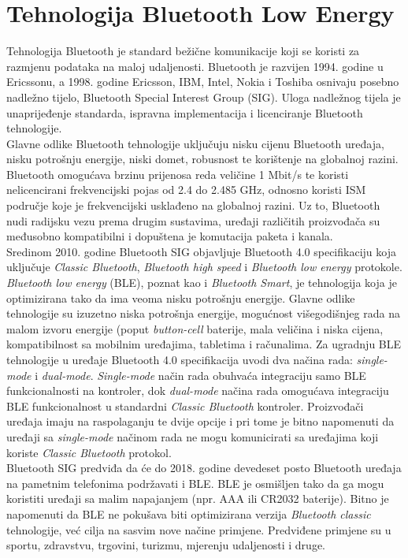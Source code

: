 \chapter{Tehnologija Bluetooth Low Energy}
Tehnologija Bluetooth je standard bežične komunikacije koji se koristi za razmjenu podataka na maloj udaljenosti. Bluetooth je razvijen 1994. godine u Ericssonu, a 1998. godine Ericsson, IBM, Intel, Nokia i Toshiba osnivaju posebno nadležno tijelo, Bluetooth Special Interest Group (SIG). Uloga nadležnog tijela je unaprijeđenje standarda, ispravna implementacija i licenciranje Bluetooth tehnologije.
\\

Glavne odlike Bluetooth tehnologije uključuju nisku cijenu Bluetooth uređaja, nisku potrošnju energije, niski domet, robusnost te korištenje na globalnoj razini.
Bluetooth omogućava brzinu prijenosa reda veličine 1 Mbit/s te koristi nelicencirani frekvencijski pojas od 2.4 do 2.485 GHz, odnosno koristi ISM područje  koje je frekvencijski usklađeno na globalnoj razini. 
Uz to, Bluetooth nudi radijsku vezu prema drugim sustavima, uređaji različitih proizvođača su međusobno kompatibilni i dopuštena je komutacija paketa i kanala.
\\

Sredinom 2010. godine Bluetooth SIG objavljuje Bluetooth 4.0 specifikaciju koja uključuje \textit{Classic Bluetooth}, \textit{Bluetooth high speed} i \textit{Bluetooth low energy} protokole.
\\
\textit{Bluetooth low energy} (BLE), poznat kao i \textit{Bluetooth Smart}, je tehnologija koja je optimizirana tako da ima veoma nisku potrošnju energije. 
Glavne odlike tehnologije su izuzetno niska potrošnja energije, mogućnost višegodišnjeg rada na malom izvoru energije (poput \textit{button-cell} baterije, mala veličina i niska cijena, kompatibilnost sa mobilnim uređajima, tabletima i računalima.
Za ugradnju BLE tehnologije u uređaje Bluetooth 4.0 specifikacija uvodi dva načina rada: \textit{single-mode} i \textit{dual-mode}. 
\textit{Single-mode} način rada obuhvaća integraciju samo BLE funkcionalnosti na kontroler, dok \textit{dual-mode} načina rada omogućava integraciju BLE funkcionalnost u standardni \textit{Classic Bluetooth} kontroler. 
Proizvođači uređaja imaju na raspolaganju te dvije opcije i pri tome je bitno napomenuti da uređaji sa \textit{single-mode} načinom rada ne mogu komunicirati sa uređajima koji koriste \textit{Classic Bluetooth} protokol.
\\

Bluetooth SIG predviđa da će do 2018. godine devedeset posto Bluetooth uređaja na pametnim telefonima podržavati i BLE. BLE je osmišljen tako da ga mogu koristiti uređaji sa malim napajanjem (npr. AAA ili CR2032 baterije). 
Bitno je napomenuti da BLE ne pokušava biti optimizirana verzija \textit{Bluetooth classic} tehnologije, već cilja na sasvim nove načine primjene.  
Predviđene primjene su u sportu, zdravstvu, trgovini, turizmu, mjerenju udaljenosti i druge.  
